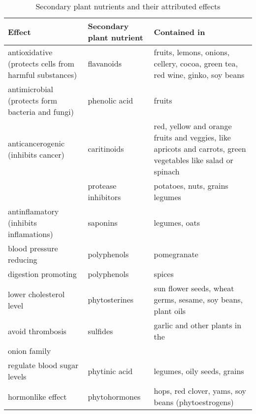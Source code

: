 \documentclass[../main.tex]{subfiles}
\begin{document}
  \noindent
  \begin{table}[htb!]
    \centering
    \begin{tabular}{p{3.5cm}p{2.5cm}p{5.5cm}}
      \textbf{Effect} & \textbf{Secondary plant nutrient} & \textbf{Contained in} \\
      \hline
      antioxidative\index{effect!antioxidative} (protects cells from harmful substances) & flavanoids
                                                          & fruits, lemons, onions, cellery, cocoa, green tea, red wine, ginko, soy beans \\
      antimicrobial\index{effect!antimicrobial} (protects form bacteria and fungi) & phenolic acid & fruits \\
      anticancerogenic\index{effect!anticancerogenic} (inhibits cancer) & caritinoids
                                                          & red, yellow and orange fruits and veggies, like apricots and carrots, green vegetables like salad or spinach \\
                      & protease inhibitors & potatoes, nuts, grains legumes \\
      antinflamatory\index{effect!antinflamatory} (inhibits inflamations) & saponins & legumes, oats \\
      blood pressure reducing\index{effect!blood pressure, reduce} & polyphenols & pomegranate \\
      digestion promoting\index{effect!digestion, promote} & polyphenols & spices\\
     lower cholesterol level\index{effect!cholesterol level, lower} & phytosterines & sun flower seeds, wheat germs, sesame, soy beans, plant oils \\
      avoid thrombosis\index{effect!thrombosis, avoid} & sulfides & garlic and other plants in the \\      onion family \\
      regulate blood sugar levels\index{effect!blood sugar level!regulate} & phytinic acid & legumes, oily seeds, grains \\
      hormonlike effect\index{effect!hormonlike effect} & phytohormones & hops, red clover, yams, soy beans (phytoestrogens)\\
      \end{tabular}
    \caption[Secondary plant nutrients]{Secondary plant nutrients and their attributed effects}
  \end{table}
\end{document}
